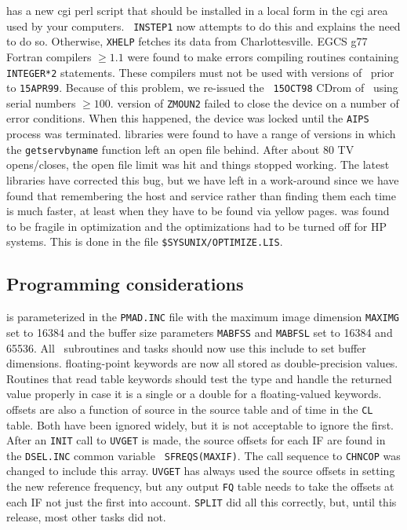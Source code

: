 \begin{description}
 has a new cgi perl script that should be installed in
    a local form in the cgi area used by your computers.  {\tt
    INSTEP1} now attempts to do this and explains the need to do so.
    Otherwise, {\tt XHELP} fetches its data from Charlottesville.
 EGCS g77 Fortran compilers $\ge 1.1$ were found to make
    errors compiling routines containing {\tt INTEGER*2} statements.
    These compilers must not be used with versions of \AIPS\ prior to
    {\tt 15APR99}\@.  Because of this problem, we re-issued the {\tt
    15OCT98} CDrom of \AIPS\ using serial numbers $\ge 100$.
 version of {\tt ZMOUN2} failed to close the device on a
    number of error conditions.  When this happened, the device was
    locked until the {\tt AIPS} process was terminated.
 libraries were found to have a range of versions in
    which the {\tt getservbyname} function left an open file behind.
    After about 80 TV opens/closes, the open file limit was hit and
    things stopped working.  The latest libraries have corrected this
    bug, but we have left in a work-around since we have found that
    remembering the host and service rather than finding them each
    time is much faster, at least when they have to be found via
    yellow pages.
 was found to be fragile in optimization and the
    optimizations had to be turned off for HP systems.  This is done
    in the file {\tt \$SYSUNIX/OPTIMIZE.LIS}\@.
\end{description}

\subsection{Programming considerations}

\begin{description}
 is parameterized in the {\tt PMAD.INC} file with
    the maximum image dimension {\tt MAXIMG} set to 16384 and the
    buffer size parameters {\tt MABFSS} and {\tt MABFSL} set to 16384
    and 65536.  All \AIPS\ subroutines and tasks should now use this
    include to set buffer dimensions.
 floating-point keywords are now all stored as
    double-precision values.  Routines that read table keywords should
    test the type and handle the returned value properly in case it is
    a single or a double for a floating-valued keywords.
 offsets are also a function of source in the source
    table and of time in the {\tt CL} table.  Both have been ignored
    widely, but it is not acceptable to ignore the first.  After an
    {\tt INIT} call to {\tt UVGET} is made, the source offsets for
    each IF are found in the {\tt DSEL.INC} common variable {\tt
    SFREQS(MAXIF)}\@.  The call sequence to {\tt CHNCOP} was changed
    to include this array.  {\tt UVGET} has always used the source
    offsets in setting the new reference frequency, but any output
    {\tt FQ} table needs to take the offsets at each IF not just the
    first into account.  {\tt SPLIT} did all this correctly, but,
    until this release, most other tasks did not.
\end{description}

